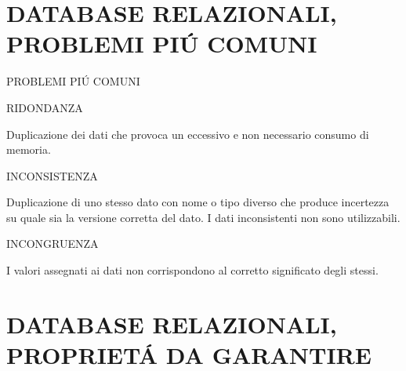 \documentclass[aspectratio=1610]{beamer}
\begin{document}
\section{DATABASE RELAZIONALI, PROBLEMI PI\'U COMUNI}

\begin{frame}{PROBLEMI PI\'U COMUNI}
    \begin{alertblock}{RIDONDANZA}
        \begin{minipage}{0.98\linewidth}
            \justifying
            Duplicazione dei dati che provoca un eccessivo e non necessario consumo di memoria.
        \end{minipage}
    \end{alertblock}
    \pause
    \begin{alertblock}{INCONSISTENZA}
        \begin{minipage}{0.98\linewidth}
            \justifying
            Duplicazione di uno stesso dato con nome o tipo diverso che produce 
            incertezza su quale sia la versione corretta del dato. I dati inconsistenti non 
            sono utilizzabili.
        \end{minipage}
    \end{alertblock}
    \pause
    \begin{alertblock}{INCONGRUENZA}
        \begin{minipage}{0.98\linewidth}
            \justifying
            I valori assegnati ai dati non corrispondono al corretto significato degli stessi.
        \end{minipage}
    \end{alertblock}
\end{frame}

\section{DATABASE RELAZIONALI, PROPRIET\'A DA GARANTIRE}
\end{document}
